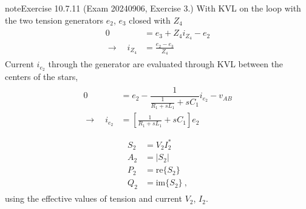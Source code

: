 \documentclass[letterpaper,10pt,italian]{jupyterBook}
\begin{document}
\begin{sphinxadmonition}{note}{Exercise 10.7.11 (Exam 2024\sphinxhyphen{}09\sphinxhyphen{}06, Exercise 3.)}
\sphinxAtStartPar
{} With KVL on the loop with the two tension generators \(e_2\), \(e_3\) closed with \(Z_4\)
\begin{equation*}
\begin{split}\begin{aligned}
  0 & = e_3 + Z_4 i_{Z_4} - e_2 \\
  \rightarrow \quad i_{Z_4} & = \frac{e_2 - e_3}{Z_4}
\end{aligned}\end{split}
\end{equation*}
\sphinxAtStartPar
{} Current \(i_{e_2}\) through the generator are evaluated through KVL between the centers of the stars,
\begin{equation*}
\begin{split}\begin{aligned}
  0
  & = e_2 - \dfrac{1}{\frac{1}{R_1 + s L_1} + s C_1 } i_{e_2} - v_{AB} \\
  \rightarrow \quad i_{e_2} & = \left[ \frac{1}{R_1 + s L_1} + s C_1 \right] e_2 \\
\end{aligned}\end{split}
\end{equation*}
\sphinxAtStartPar
{}
\begin{equation*}
\begin{split}\begin{aligned}
  S_2 & = V_2 I_2^* \\
  A_2 & = |S_2| \\
  P_2 & = \text{re} \{ S_2 \} \\
  Q_2 & = \text{im} \{ S_2 \} \ ,
\end{aligned}\end{split}
\end{equation*}
\sphinxAtStartPar
using the effective values of tension and current \(V_2\), \(I_2\).
\end{sphinxadmonition}
 \label{exercise:exam-24-07-22-exe-03}
\end{document}
